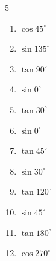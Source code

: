 \begin{multicols}{5}
\begin{enumerate}

  \item $\displaystyle \cos{45^\circ}$


  \item $\displaystyle \sin{135^\circ}$


\columnbreak %

\resetques

  \item $\displaystyle \tan{90^\circ}$

        \phantom{$\displaystyle なし$}

  \item $\displaystyle \sin{0^\circ}$

        \phantom{$\displaystyle =0$}

  \item $\displaystyle \tan{30^\circ}$


  \item $\displaystyle \sin{0^\circ}$

        \phantom{$\displaystyle =0$}

  \item $\displaystyle \tan{45^\circ}$

        \phantom{$\displaystyle =1$}

  \item $\displaystyle \sin{30^\circ}$


  \item $\displaystyle \tan{120^\circ}$


  \item $\displaystyle \sin{45^\circ}$


  \item $\displaystyle \tan{180^\circ}$

        \phantom{$\displaystyle =0$}

  \item $\displaystyle \cos{270^\circ}$

        \phantom{$\displaystyle =0$}


\end{enumerate}
\end{multicols}
